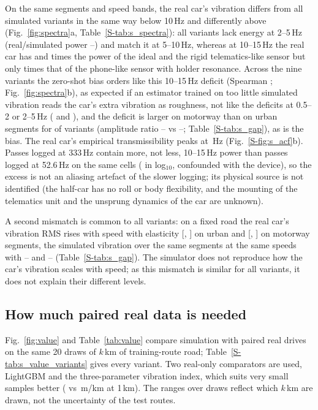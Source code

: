 On the same segments and speed bands, the real car's vibration differs from all simulated variants in the same way below 10\,Hz and differently above (Fig.~\ref{fig:spectra}a, Table~\ref{S-tab:s_spectra}): all variants lack energy at 2--5\,Hz (real/simulated power \spVoneMidPow--\spVfiveMidPow) and match it at 5--10\,Hz, whereas at 10--15\,Hz the real car has \spVthreeHighPow{} and \spVoneHighPow{} times the power of the ideal and the rigid telematics-like sensor but only \spVtwoHighPow{} times that of the phone-like sensor with holder resonance.
Across the nine variants the zero-shot bias orders like this 10--15\,Hz deficit (Spearman \bgRhoHigh; Fig.~\ref{fig:spectra}b), as expected if an estimator trained on too little simulated vibration reads the car's extra vibration as roughness, not like the deficits at 0.5--2 or 2--5\,Hz (\bgRhoLow{} and \bgRhoMid), and the deficit is larger on motorway than on urban segments for \bgcMotorwayLarger{} of \bgcNvar{} variants (amplitude ratio \bgcMotorwayMin--\bgcMotorwayMax{} vs \bgcUrbanMin--\bgcUrbanMax; Table~\ref{S-tab:s_gap}), as is the bias.
The real car's empirical transmissibility peaks at \invPeakHz\,Hz (Fig.~\ref{S-fig:s_acf}b).
Passes logged at 333\,Hz contain more, not less, 10--15\,Hz power than passes logged at 52.6\,Hz on the same cells (\spAliasHigh{} in log$_{10}$, confounded with the device), so the excess is not an aliasing artefact of the slower logging; its physical source is not identified (the half-car has no roll or body flexibility, and the mounting of the telematics unit and the unsprung dynamics of the car are unknown).

A second mismatch is common to all variants: on a fixed road the real car's vibration RMS rises with speed with elasticity \ssRealUrban{} [\ssRealUrbanLo, \ssRealUrbanHi] on urban and \ssRealMotorway{} [\ssRealMotorwayLo, \ssRealMotorwayHi] on motorway segments, the simulated vibration over the same segments at the same speeds with \ssSimUrbanMin--\ssSimUrbanMax{} and \ssSimMotorwayMin--\ssSimMotorwayMax{} (Table~\ref{S-tab:s_gap}).
The simulator does not reproduce how the car's vibration scales with speed; as this mismatch is similar for all variants, it does not explain their different levels.

\subsection{How much paired real data is needed}
\label{sec:res_value}

Fig.~\ref{fig:value} and Table~\ref{tab:value} compare simulation with paired real drives on the same 20 draws of $k$\,km of training-route road; Table~\ref{S-tab:s_value_variants} gives every variant.
Two real-only comparators are used, LightGBM and the three-parameter vibration index, which suits very small samples better (\vbRealIdxOne{} vs \vbRealOnlyOne\,m/km at 1\,km).
The ranges over draws reflect which $k$\,km are drawn, not the uncertainty of the test routes.

